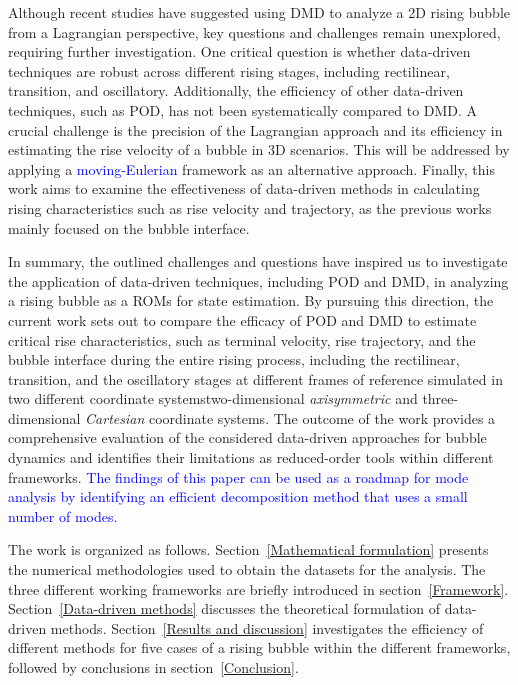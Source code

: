 \documentclass[a4paper,fleqn]{cas-sc}
\newcommand{\hl}[1]{\textcolor{blue}{#1}}
\newcommand{\hl}[1]{#1}
\begin{document}
	Although recent studies have suggested using DMD to analyze a 2D rising bubble from a Lagrangian perspective, key questions and challenges remain unexplored, requiring further investigation. One critical question is whether data-driven techniques are robust across different rising stages, including rectilinear, transition, and oscillatory. Additionally, the efficiency of other data-driven techniques, such as POD, has not been systematically compared to DMD. A crucial challenge is the precision of the Lagrangian approach and its efficiency in estimating the rise velocity of a bubble in 3D scenarios. This will be addressed by applying a \hl{moving-Eulerian} framework as an alternative approach. Finally, this work aims to examine the effectiveness of data-driven methods in calculating rising characteristics such as rise velocity and trajectory, as the previous works mainly focused on the bubble interface. 
	
	In summary, the outlined challenges and questions have inspired us to investigate the application of data-driven techniques, including POD and DMD, in analyzing a rising bubble as a ROMs for state estimation. By pursuing this direction, the current work sets out to compare the efficacy of POD and DMD to estimate critical rise characteristics, such as terminal velocity, rise trajectory, and the bubble interface during the entire rising process, including the rectilinear, transition, and the oscillatory stages at different frames of reference simulated in two different coordinate systems\textemdash two-dimensional \textit{axisymmetric} and three-dimensional \textit{Cartesian} coordinate systems. The outcome of the work provides a comprehensive evaluation of the considered data-driven approaches for bubble dynamics and identifies their limitations as reduced-order tools within different frameworks. \hl{The findings of this paper can be used as a roadmap for mode analysis by identifying an efficient decomposition method that uses a small number of modes.}
	
	The work is organized as follows. Section~\ref{Mathematical formulation} presents the numerical methodologies used to obtain the datasets for the analysis. The three different working frameworks are briefly introduced in section~\ref{Framework}. Section~\ref {Data-driven methods} discusses the theoretical formulation of data-driven methods. Section~\ref{Results and discussion} investigates the efficiency of different methods for five cases of a rising bubble within the different frameworks, followed by conclusions in section~\ref{Conclusion}.
	
\end{document}
